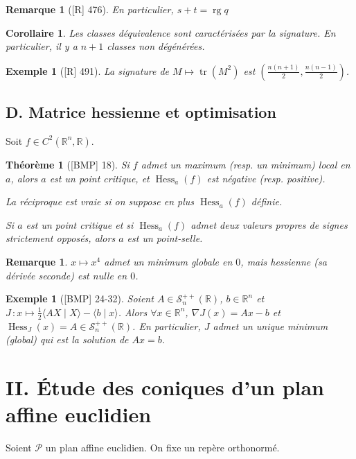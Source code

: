 \documentclass[10pt, a4paper, parskip=full, twoside, twocolumn]{report}
\newtheorem{theorem}[definition]{Théorème}
\newtheorem{corollary}[definition]{Corollaire}
\newtheorem{example}[definition]{Exemple}
\newtheorem{remark}[definition]{Remarque}
\newcommand{\IR}{\mathbb{R}}
\DeclareMathOperator{\rg}{rg}
\DeclareMathOperator{\tr}{tr}
\DeclareMathOperator{\Hess}{Hess}
\begin{document}
\begin{remark}[\textnormal{[R] 476}]
	En particulier, $s+t = \rg q$
\end{remark}

\begin{corollary}
	Les classes déquivalence sont caractérisées par la signature. En particulier, il y a $n+1$ classes non dégénérées.
\end{corollary}

\begin{example}[\textnormal{[R] 491}]
	La signature de $M\mapsto \tr(M^2)$ est $\left(\frac{n(n+1)}{2}, \frac{n(n-1)}{2}\right)$.
\end{example}

\subsection*{D. Matrice hessienne et optimisation}
\textcolor{paragraphtext}{Soit $f\in C^2(\IR^n,\IR)$.}

\begin{theorem}[\textnormal{[BMP] 18}]
	Si $f$ admet un maximum (resp. un minimum) local en $a$, alors $a$ est un 
	point critique, et $\Hess_a(f)$ est négative (resp. positive).

	La réciproque est vraie si on suppose en plus $\Hess_a(f)$ définie.

	Si $a$ est un point critique et si $\Hess_a(f)$ admet deux valeurs propres de signes strictement opposés, alors $a$ est un \emph{point-selle}.
\end{theorem}

\begin{remark}
	$x\mapsto x^4$ admet un minimum globale en $0$, mais hessienne (sa dérivée seconde) est nulle en $0$.
\end{remark}

\begin{example}[\textnormal{[BMP] 24-32}]
	Soient $A\in\mathcal{S}_n^{++}(\IR)$, $b\in\IR^n$ et $J\,\colon x\mapsto \frac{1}{2}\langle AX\mid X\rangle - \langle b\mid x\rangle$.
	Alors $\forall x\in \IR^n$, $\nabla J(x)=Ax-b$ et $\Hess_J(x) = A\in\mathcal{S}_n^{++}(\IR)$.
	En particulier, $J$ admet un unique minimum (global) qui est la solution de $Ax= b$.
\end{example}

\section*{II. Étude des coniques d'un plan affine euclidien}
\textcolor{paragraphtext}{Soient $\mathcal{P}$ un plan affine euclidien. On fixe un repère orthonormé.}
\end{document}
